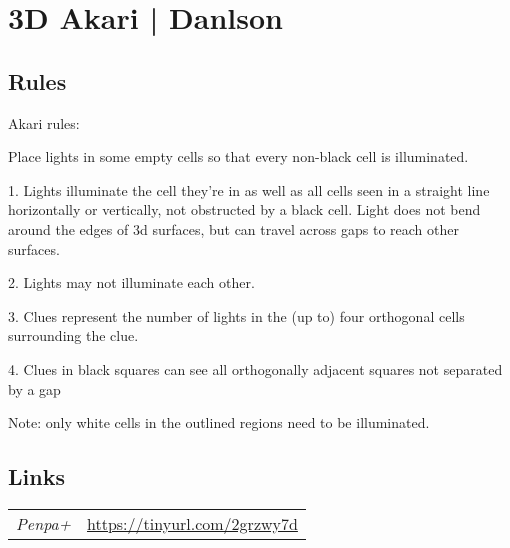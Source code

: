 \section[3D Akari | Danlson {[\emph{3D Akari}]}]{3D Akari | {\normalfont Danlson}}
\label{sec:17-3d-akari-danlson}

\subsection*{Rules}
\begin{markdown}
Akari rules:

Place lights in some empty cells so that every non-black cell is illuminated.

1. Lights illuminate the cell they’re in as well as all cells seen in a straight line horizontally or vertically, not obstructed by a black cell. Light does not bend around the edges of 3d surfaces, but can travel across gaps to reach other surfaces.

2. Lights may not illuminate each other.

3. Clues represent the number of lights in the (up to) four orthogonal cells surrounding the clue.

4. Clues in black squares can see all orthogonally adjacent squares not separated by a gap



Note:  only white cells in the outlined regions need to be illuminated.
\end{markdown}
\subsection*{Links}
\begin{tabularx}{\textwidth}{l X}
\emph{Penpa+} & \url{https://tinyurl.com/2grzwy7d} \\
\end{tabularx}
\pagebreak
